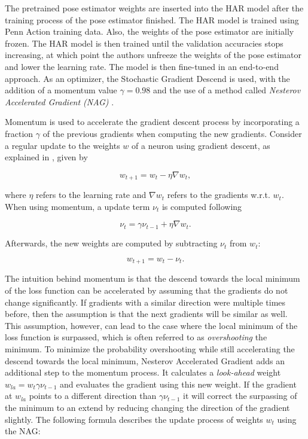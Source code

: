 The pretrained pose estimator weights are inserted into the HAR model after the training process of the pose estimator finished.
The HAR model is trained using Penn Action training data.
Also, the weights of the pose estimator are initially frozen.
The HAR model is then trained until the validation accuracies stops increasing, at which point the authors unfreeze the weights of the pose estimator and lower the learning rate.
The model is then fine-tuned in an end-to-end approach.
As an optimizer, the Stochastic Gradient Descend is used, with the addition of a momentum value $\gamma = 0.98$ and the use of a method called \textit{Nesterov Accelerated Gradient (NAG)} \cite{nesterov_method_1983}.

Momentum is used to accelerate the gradient descent process by incorporating a fraction $\gamma$ of the previous gradients when computing the new gradients.
Consider a regular update to the weights $w$ of a neuron using gradient descent, as explained in , given by

\begin{equation}
    w_{t+1} = w_t - \eta \nabla w_t,
\end{equation}

where $\eta$ refers to the learning rate and $\nabla w_t$ refers to the gradients w.r.t. $w_t$.
When using momentum, a update term $\nu_t$ is computed following

\begin{equation}
    \nu_t = \gamma \nu_{t-1} + \eta \nabla w_t.
\end{equation}

Afterwards, the new weights are computed by subtracting $\nu_t$ from $w_t$:

\begin{equation}
    w_{t+1} = w_t - \nu_t.
\end{equation}

The intuition behind momentum is that the descend towards the local minimum of the loss function can be accelerated by assuming that the gradients do not change significantly.
If gradients with a similar direction were multiple times before, then the assumption is that the next gradients will be similar as well.
This assumption, however, can lead to the case where the local minimum of the loss function is surpassed, which is often referred to as \textit{overshooting} the minimum.
To minimize the probability overshooting while still accelerating the descend towards the local minimum, Nesterov Accelerated Gradient adds an additional step to the momentum process.
It calculates a \textit{look-ahead} weight $w_{la} = w_{t} \gamma \nu_{t-1}$ and evaluates the gradient using this new weight.
If the gradient at $w_{la}$ points to a different direction than $\gamma \nu_{t-1}$ it will correct the surpassing of the minimum to an extend by reducing changing the direction of the gradient slightly.
The following formula describes the update process of weights $w_t$ using the NAG:

